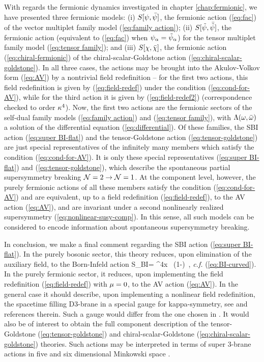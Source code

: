 With regards the fermionic dynamics investigated in chapter \ref{chap:fermionic}, we have presented three fermionic models: 
(i) $S[\psi,{\bar {\psi}}]$, the fermionic action (\ref{eq:fac}) of the vector multiplet family model (\ref{eq:family action}); 
(ii) $S[{\tilde {\psi}},{\bar {\tilde {\psi}}}]$, the fermionic action (equivalent to (\ref{eq:fac}) when $\psi_\alpha={\tilde {\psi}}_\alpha$) for the tensor multiplet family model (\ref{eq:tensor family}); and 
(iii) $S[\chi,{\bar {\chi}}]$, the fermionic action (\ref{eq:chiral-fermionic}) of the chiral-scalar-Goldstone action (\ref{eq:chiral-scalar-goldstone}). 
In all three cases, the actions may be brought into the Akulov-Volkov form (\ref{eq:AV}) by a nontrivial field redefinition -- for the first two actions, this field redefinition is given by (\ref{eq:field-redef}) under the condition (\ref{eq:cond-for-AV}), while for the third action it is given by (\ref{eq:field-redef2}) (correspondence checked to order $\kappa^4$). Now, the first two actions are the fermionic sectors of the self-dual family models (\ref{eq:family action}) and (\ref{eq:tensor family}), with $\Lambda(\omega, {\bar {\omega}})$ a solution of the differential equation (\ref{eq:differential}). Of these families, the SBI action (\ref{eq:super BI-flat}) and the tensor-Goldstone action (\ref{eq:tensor-goldstone}) are just special representatives of the infinitely many members which satisfy the condition (\ref{eq:cond-for-AV}). It is only these special representatives (\ref{eq:super BI-flat}) and (\ref{eq:tensor-goldstone}), which describe the spontaneous partial supersymmetry breaking ${\cal N}=2 \to {\cal N}=1$. At the component level, however, the purely fermionic actions of all these members satisfy the condition (\ref{eq:cond-for-AV}) and are equivalent, up to a field redefinition (\ref{eq:field-redef}), to the AV action (\ref{eq:AV}), and are invariant under a second nonlinearly realized supersymmetry (\ref{eq:nonlinear-susy-comp}). In this sense, all such models can be considered to encode information about spontaneous supersymmetry breaking. 

In conclusion, we make a final comment regarding the SBI action (\ref{eq:super BI-flat}). In the purely bosonic sector, this theory reduces, upon elimination of the auxiliary field, to the Born-Infeld action
\be
\label{eq:BI}
S_{\rm BI}=  \int\!^4x \,
\left(1-\right)~,
\ee
{\it c.f.} (\ref{eq:BI-curved}). In the purely fermionic sector, it reduces, upon implementing the field redefinition (\ref{eq:field-redef}) with $\mu=0$, to the AV action (\ref{eq:AV}). In the general case it should describe, upon implementing a nonlinear field redefinition, the spacetime filling D3-brane in a special gauge for kappa-symmetry, see \cite{Aganagic:1996nn,Tseytlin:1999dj} and references therein. Such a gauge would differ from the one chosen in \cite{Aganagic:1996nn}. It would also be of interest to obtain the full component description of the tensor-Goldstone (\ref{eq:tensor-goldstone}) and chiral-scalar-Goldstone (\ref{eq:chiral-scalar-goldstone}) theories. Such actions may be interpreted in terms of super 3-brane actions in five and six dimensional Minkowski space \cite{Rocek:1997hi}.

